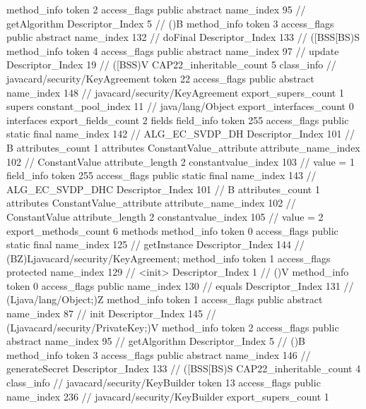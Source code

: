 {{{{{				}
				method_info {
					token	2
					access_flags	public abstract
					name_index	95		// getAlgorithm
					Descriptor_Index	5		// ()B
				}
				method_info {
					token	3
					access_flags	public abstract
					name_index	132		// doFinal
					Descriptor_Index	133		// ([BSS[BS)S
				}
				method_info {
					token	4
					access_flags	public abstract
					name_index	97		// update
					Descriptor_Index	19		// ([BSS)V
				}
			}
			CAP22_inheritable_count	5
		}
		class_info {		// javacard/security/KeyAgreement
			token	22
			access_flags	public abstract
			name_index	148		// javacard/security/KeyAgreement
			export_supers_count	1
			supers {
				constant_pool_index	11		// java/lang/Object
			}
			export_interfaces_count	0
			interfaces {
			}
			export_fields_count	2
			fields {
			field_info {
				token	255
				access_flags	public static final
				name_index	142		// ALG_EC_SVDP_DH
				Descriptor_Index	101		// B
				attributes_count	1
				attributes {
				ConstantValue_attribute {
					attribute_name_index	102		// ConstantValue
					attribute_length	2
					constantvalue_index	103		// value = 1
				}
				}
			}
			field_info {
				token	255
				access_flags	public static final
				name_index	143		// ALG_EC_SVDP_DHC
				Descriptor_Index	101		// B
				attributes_count	1
				attributes {
				ConstantValue_attribute {
					attribute_name_index	102		// ConstantValue
					attribute_length	2
					constantvalue_index	105		// value = 2
				}
				}
			}
			}
			export_methods_count	6
			methods {
				method_info {
					token	0
					access_flags	public static final
					name_index	125		// getInstance
					Descriptor_Index	144		// (BZ)Ljavacard/security/KeyAgreement;
				}
				method_info {
					token	1
					access_flags	protected
					name_index	129		// <init>
					Descriptor_Index	1		// ()V
				}
				method_info {
					token	0
					access_flags	public
					name_index	130		// equals
					Descriptor_Index	131		// (Ljava/lang/Object;)Z
				}
				method_info {
					token	1
					access_flags	public abstract
					name_index	87		// init
					Descriptor_Index	145		// (Ljavacard/security/PrivateKey;)V
				}
				method_info {
					token	2
					access_flags	public abstract
					name_index	95		// getAlgorithm
					Descriptor_Index	5		// ()B
				}
				method_info {
					token	3
					access_flags	public abstract
					name_index	146		// generateSecret
					Descriptor_Index	133		// ([BSS[BS)S
				}
			}
			CAP22_inheritable_count	4
		}
		class_info {		// javacard/security/KeyBuilder
			token	13
			access_flags	public
			name_index	236		// javacard/security/KeyBuilder
			export_supers_count	1
}}}
